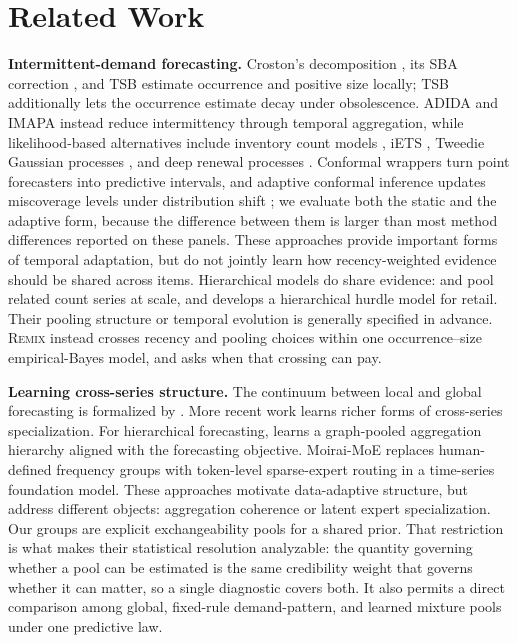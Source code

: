 \documentclass[twocolumn,10pt]{article}
\theoremstyle{definition}
\newcommand{\REMIX}{\textsc{Remix}}
\begin{document}
\section{Related Work}\label{sec:related}

\textbf{Intermittent-demand forecasting.} Croston's decomposition
\citep{croston1972}, its SBA correction \citep{syntetos2005accuracy}, and
TSB \citep{teunter2011} estimate occurrence and positive size locally;
TSB additionally lets the occurrence estimate decay under obsolescence.
ADIDA \citep{nikolopoulos2011} and IMAPA \citep{kourentzes2016} instead
reduce intermittency through temporal aggregation, while likelihood-based
alternatives include inventory count models \citep{snyder2012}, iETS
\citep{svetunkov2023iets}, Tweedie Gaussian processes \citep{damato2025},
and deep renewal processes \citep{turkmen2019}. Conformal wrappers turn
point forecasters into predictive intervals, and adaptive conformal
inference updates miscoverage levels under distribution shift
\citep{gibbs2021}; we evaluate both the static and the adaptive form,
because the difference between them is larger than most method
differences reported on these panels. These approaches provide important
forms of temporal adaptation, but do not jointly learn how
recency-weighted evidence should be shared across items. Hierarchical
models do share evidence: \citet{chapados2014} and \citet{seeger2016}
pool related count series at scale, and \citet{pitkin2024} develops a
hierarchical hurdle model for retail. Their pooling structure or temporal
evolution is generally specified in advance. \REMIX{} instead crosses
recency and pooling choices within one occurrence--size empirical-Bayes
model, and asks when that crossing can pay.

\textbf{Learning cross-series structure.} The continuum between local and
global forecasting is formalized by \citet{monteromanso2021}. More recent
work learns richer forms of cross-series specialization. For hierarchical
forecasting, \citet{cini2024} learns a graph-pooled aggregation hierarchy
aligned with the forecasting objective. Moirai-MoE \citep{liu2025moirai}
replaces human-defined frequency groups with token-level sparse-expert
routing in a time-series foundation model. These approaches motivate
data-adaptive structure, but address different objects: aggregation
coherence or latent expert specialization. Our groups are explicit
exchangeability pools for a shared prior. That restriction is what makes
their statistical resolution analyzable: the quantity governing whether a
pool can be estimated is the same credibility weight that governs whether
it can matter, so a single diagnostic covers both. It also permits a
direct comparison among global, fixed-rule demand-pattern, and learned
mixture pools under one predictive law.
\end{document}
